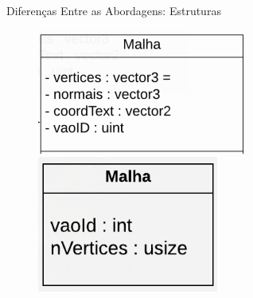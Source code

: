 \documentclass{beamer}
\begin{document}
\begin{frame}{Diferenças Entre as Abordagens: Estruturas}
    \begin{figure}
    \centering
        \begin{minipage}[b]{0.35\textwidth}
            \includegraphics[width=\textwidth]{figuras/meshood}
        \end{minipage}
        \hspace{1.5cm}
        \begin{minipage}[b]{0.35\textwidth}
            \includegraphics[width=\textwidth]{figuras/meshdod}
        \end{minipage}
    \end{figure}
\end{frame}
\end{document}
